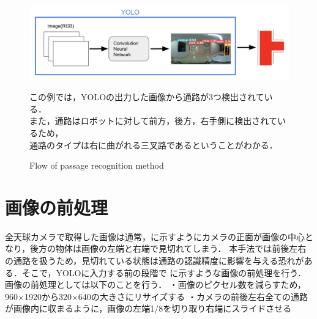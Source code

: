 \documentclass[../main]{subfiles}
\newcommand*\circled[1]{\tikz[baseline=(char.base)]{
            \node[shape=circle,draw,inner sep=1pt] (char) {#1};}}
\begin{document}
        \begin{figure}[H]
            \centering
            \includegraphics[width=15cm]{../images/proposed_method2.png}
            \caption{Flow of passage recognition method}
            \label{figure::proposed_method_fig}
            この例では，YOLOの出力した画像から通路が3つ検出されている．\\
            また，通路はロボットに対して前方，後方，右手側に検出されているため，\\
            通路のタイプは\circled{6}右に曲がれる三叉路であるということがわかる．
        \end{figure}

        \newpage

        \section{画像の前処理}
        全天球カメラで取得した画像は通常，に示すようにカメラの正面が画像の中心となり，後方の物体は画像の左端と右端で見切れてしまう．
        本手法では前後左右の通路を扱うため，見切れている状態は通路の認識精度に影響を与える恐れがある．そこで，YOLOに入力する前の段階で
        に示すような画像の前処理を行う．
        画像の前処理としては以下のことを行う．
        ・画像のピクセル数を減らすため，960×1920から320×640の大きさにリサイズする
        ・カメラの前後左右全ての通路が画像内に収まるように，画像の左端1/8を切り取り右端にスライドさせる
    
\end{document}
